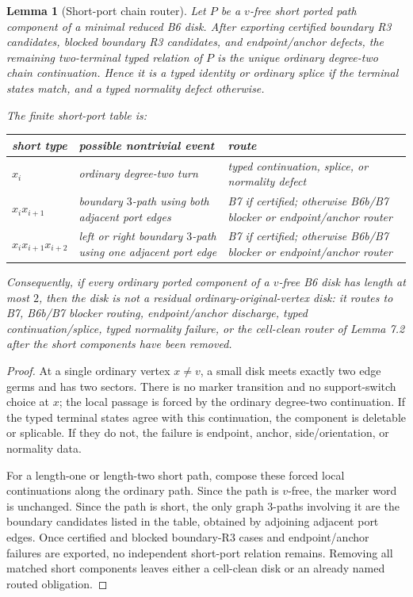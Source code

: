 \documentclass[11pt]{amsart}
\newtheorem{lemma}[theorem]{Lemma}
\theoremstyle{definition}
\begin{document}
\begin{lemma}[Short-port chain router]
Let \(P\) be a \(v\)-free short ported path component of a minimal reduced B6 disk. After exporting certified boundary R3 candidates, blocked boundary R3 candidates, and endpoint/anchor defects, the remaining two-terminal typed relation of \(P\) is the unique ordinary degree-two chain continuation. Hence it is a typed identity or ordinary splice if the terminal states match, and a typed normality defect otherwise.

The finite short-port table is:

\begin{center}
\begin{tabular}{p{}p{}p{}}
short type & possible nontrivial event & route \\ \hline
\(x_i\) & ordinary degree-two turn & typed continuation, splice, or normality defect \\
\(x_i x_{i+1}\) & boundary \(3\)-path using both adjacent port edges & B7 if certified; otherwise B6b/B7 blocker or endpoint/anchor router \\
\(x_i x_{i+1}x_{i+2}\) & left or right boundary \(3\)-path using one adjacent port edge & B7 if certified; otherwise B6b/B7 blocker or endpoint/anchor router \\
\end{tabular}
\end{center}

Consequently, if every ordinary ported component of a \(v\)-free B6 disk has length at most \(2\), then the disk is not a residual ordinary-original-vertex disk: it routes to B7, B6b/B7 blocker routing, endpoint/anchor discharge, typed continuation/splice, typed normality failure, or the cell-clean router of Lemma 7.2 after the short components have been removed.

\end{lemma}
\begin{proof}
At a single ordinary vertex \(x\ne v\), a small disk meets exactly two edge germs and has two sectors. There is no marker transition and no support-switch choice at \(x\); the local passage is forced by the ordinary degree-two continuation. If the typed terminal states agree with this continuation, the component is deletable or splicable. If they do not, the failure is endpoint, anchor, side/orientation, or normality data.

For a length-one or length-two short path, compose these forced local continuations along the ordinary path. Since the path is \(v\)-free, the marker word is unchanged. Since the path is short, the only graph \(3\)-paths involving it are the boundary candidates listed in the table, obtained by adjoining adjacent port edges. Once certified and blocked boundary-R3 cases and endpoint/anchor failures are exported, no independent short-port relation remains. Removing all matched short components leaves either a cell-clean disk or an already named routed obligation.

\end{proof}
\end{document}
